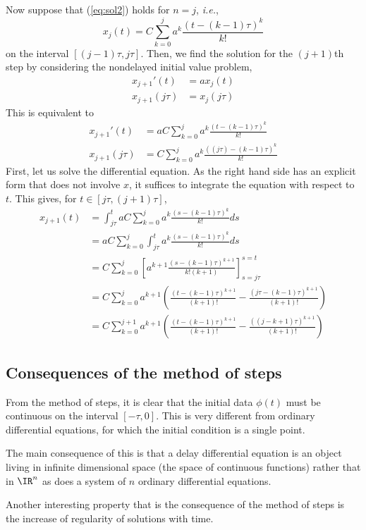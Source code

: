 Now suppose that (\ref{eq:sol2}) holds for $n=j$, \emph{i.e.},
\[
x_j(t)=C\sum_{k=0}^j a^k \frac{(t-(k-1)\tau)^k}{k!}
\]
on the interval $[(j-1)\tau,j\tau]$. Then, we find the solution
for the $(j+1)$th step by considering the nondelayed initial value
problem,
\begin{align*}
x_{j+1}'(t) &= a x_j(t) \\
x_{j+1}(j\tau) &= x_j(j\tau)
\end{align*}
This is equivalent to
\begin{align*}
x_{j+1}'(t) &= a C\sum_{k=0}^j a^k \frac{(t-(k-1)\tau)^k}{k!} \\
x_{j+1}(j\tau) &= C\sum_{k=0}^j a^k
\frac{((j\tau)-(k-1)\tau)^k}{k!}
\end{align*}
First, let us solve the differential equation. As the right hand side
has an explicit form that does not involve $x$, it suffices to
integrate the equation with respect to $t$. This gives, for
$t\in[j\tau,(j+1)\tau]$, 
\begin{align*}
x_{j+1}(t) &= \int_{j\tau}^t 
a C\sum_{k=0}^j a^k \frac{(s-(k-1)\tau)^k}{k!} ds
\\
&= aC \sum_{k=0}^j \int_{j\tau}^t a^k \frac{(s-(k-1)\tau)^k}{k!}
ds\\
&= C \sum_{k=0}^j 
\left[a^{k+1} \frac{(s-(k-1)\tau)^{k+1}}{k!(k+1)}
\right]_{s=j\tau}^{s=t}\\
&= C \sum_{k=0}^j 
a^{k+1} \left(\frac{(t-(k-1)\tau)^{k+1}}{(k+1)!}
-\frac{(j\tau-(k-1)\tau)^{k+1}}{(k+1)!}\right)
\\
&= C \sum_{k=0}^{j+1}
a^{k+1} \left(\frac{(t-(k-1)\tau)^{k+1}}{(k+1)!}
-\frac{((j-k+1)\tau)^{k+1}}{(k+1)!}\right)
\end{align*}

\subsection{Consequences of the method of steps}
From the method of steps, it is clear that the initial data $\phi(t)$ must be continuous on the interval $[-\tau,0]$. This is very different from ordinary differential equations, for which the initial condition is a single point.

The main consequence of this is that a delay differential equation is an object living in infinite dimensional space (the space of continuous functions) rather that in $\IR^n$ as does a system of $n$ ordinary differential equations.

Another interesting property that is the consequence of the method of steps is the increase of regularity of solutions with time.
